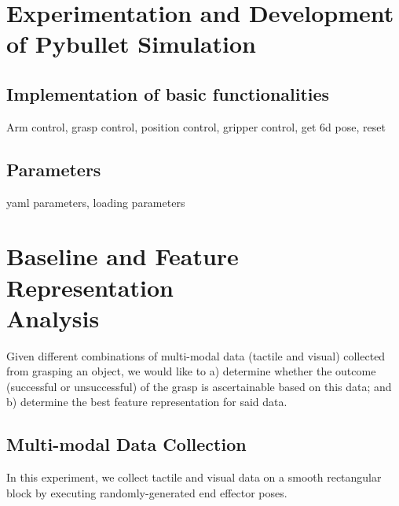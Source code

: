 \documentclass[11pt, a4paper]{report}
\theoremstyle{definition}
\begin{document}
\chapter{Experimentation and Development of Pybullet Simulation}
\label{chap:3}

\section{Implementation of basic functionalities}
Arm control, grasp control, position control, gripper control, get 6d pose, reset

\section{Parameters}
yaml parameters, loading parameters


\chapter{Baseline and Feature Representation \\ Analysis}
\label{chap:4}
Given different combinations of multi-modal data (tactile and visual) collected from grasping an object, we would like to a) determine whether the outcome (successful or unsuccessful) of the grasp is ascertainable based on this data; and b) determine the best feature representation for said data.

\section{Multi-modal Data Collection}
\label{sec:4.1}
In this experiment, we collect tactile and visual data on a smooth rectangular block by executing randomly-generated end effector poses.
\end{document}

